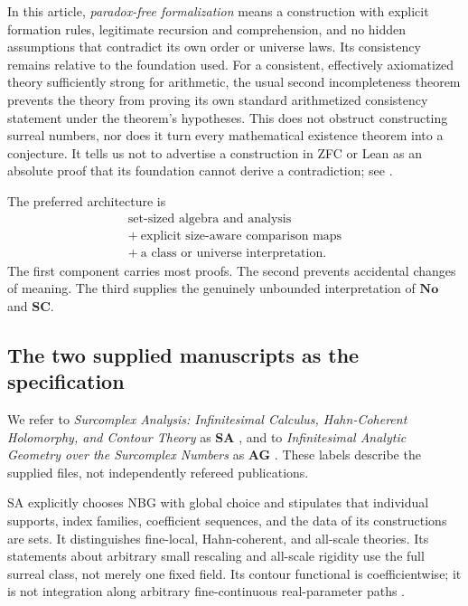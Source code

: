 \documentclass[11pt,letterpaper]{article}
\theoremstyle{definition}
\theoremstyle{remark}
\newcommand{\No}{\mathbf{No}}
\newcommand{\SC}{\mathbf{SC}}
\numberwithin{equation}{section}
\begin{document}
In this article, \emph{paradox-free formalization} means a construction with explicit formation rules, legitimate recursion and comprehension, and no hidden assumptions that contradict its own order or universe laws. Its consistency remains relative to the foundation used. For a consistent, effectively axiomatized theory sufficiently strong for arithmetic, the usual second incompleteness theorem prevents the theory from proving its own standard arithmetized consistency statement under the theorem's hypotheses. This does not obstruct constructing surreal numbers, nor does it turn every mathematical existence theorem into a conjecture. It tells us not to advertise a construction in ZFC or Lean as an absolute proof that its foundation cannot derive a contradiction; see \cite[\S5]{ShulmanSize}.

The preferred architecture is
\begin{equation}\label{eq:architecture}
 \begin{gathered}
 \boxed{\text{set-sized algebra and analysis}}\\[0.35em]
 +\ \boxed{\text{explicit size-aware comparison maps}}\\[0.35em]
 +\ \boxed{\text{a class or universe interpretation}}.
 \end{gathered}
\end{equation}
The first component carries most proofs. The second prevents accidental changes of meaning. The third supplies the genuinely unbounded interpretation of \(\No\) and \(\SC\).

\subsection{The two supplied manuscripts as the specification}
We refer to \emph{Surcomplex Analysis: Infinitesimal Calculus, Hahn-Coherent Holomorphy, and Contour Theory} as \textbf{SA} \cite{SA}, and to \emph{Infinitesimal Analytic Geometry over the Surcomplex Numbers} as \textbf{AG} \cite{AG}. These labels describe the supplied files, not independently refereed publications.

SA explicitly chooses NBG with global choice and stipulates that individual supports, index families, coefficient sequences, and the data of its constructions are sets. It distinguishes fine-local, Hahn-coherent, and all-scale theories. Its statements about arbitrary small rescaling and all-scale rigidity use the full surreal class, not merely one fixed field. Its contour functional is coefficientwise; it is not integration along arbitrary fine-continuous real-parameter paths \cite[sections on foundations, fine topology, contours, and all-scale functions]{SA}.
\end{document}
